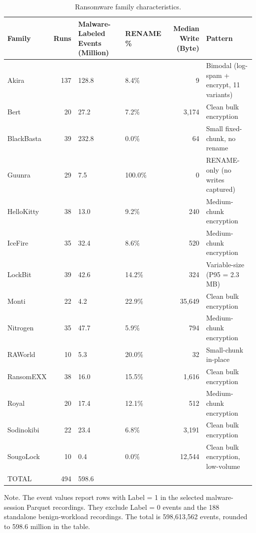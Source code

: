\begin{table}[htbp]
\centering
\small
\caption{Ransomware family characteristics.}\label{tab:3-3}
\begin{tabularx}{\textwidth}{lrllrX}
\hline
\textbf{Family} & \textbf{Runs} & \textbf{Malware-Labeled Events (Million)} & \textbf{RENAME \%} & \textbf{Median Write (Byte)} & \textbf{Pattern} \\
\hline
Akira & 137 & 128.8 & 8.4\% & 9 & Bimodal (log-spam + encrypt, 11 variants) \\
Bert & 20 & 27.2 & 7.2\% & 3,174 & Clean bulk encryption \\
BlackBasta & 39 & 232.8 & 0.0\% & 64 & Small fixed-chunk, no rename \\
Guunra & 29 & 7.5 & 100.0\% & 0 & RENAME-only (no writes captured) \\
HelloKitty & 38 & 13.0 & 9.2\% & 240 & Medium-chunk encryption \\
IceFire & 35 & 32.4 & 8.6\% & 520 & Medium-chunk encryption \\
LockBit & 39 & 42.6 & 14.2\% & 324 & Variable-size (P95 = 2.3 MB) \\
Monti & 22 & 4.2 & 22.9\% & 35,649 & Clean bulk encryption \\
Nitrogen & 35 & 47.7 & 5.9\% & 794 & Medium-chunk encryption \\
RAWorld & 10 & 5.3 & 20.0\% & 32 & Small-chunk in-place \\
RansomEXX & 38 & 16.0 & 15.5\% & 1,616 & Clean bulk encryption \\
Royal & 20 & 17.4 & 12.1\% & 512 & Medium-chunk encryption \\
Sodinokibi & 22 & 23.4 & 6.8\% & 3,191 & Clean bulk encryption \\
SougoLock & 10 & 0.4 & 0.0\% & 12,544 & Clean bulk encryption, low-volume \\
TOTAL & 494 & 598.6 &  &  &  \\
\hline
\end{tabularx}
\end{table}

Note. The event values report rows with Label = 1 in the selected malware-session Parquet recordings. They exclude Label = 0 events and the 188 standalone benign-workload recordings. The total is 598,613,562 events, rounded to 598.6 million in the table.

